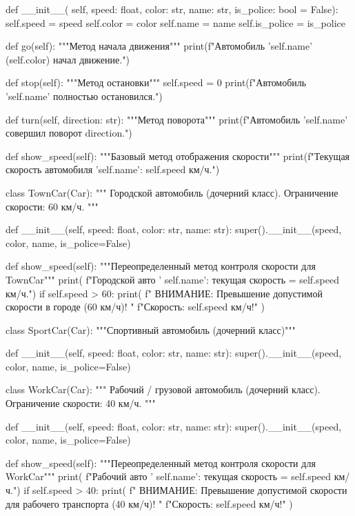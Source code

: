 \documentclass[14pt,a4paper]{extarticle}
\begin{document}
\begin{CodeListing}
    def __init__(
            self,
            speed: float,
            color: str,
            name: str,
            is_police: bool = False):
        self.speed = speed
        self.color = color
        self.name = name
        self.is_police = is_police

    def go(self):
        """Метод начала движения"""
        print(f"Автомобиль '{self.name}' ({self.color}) начал движение.")

    def stop(self):
        """Метод остановки"""
        self.speed = 0
        print(f"Автомобиль '{self.name}' полностью остановился.")

    def turn(self, direction: str):
        """Метод поворота"""
        print(f"Автомобиль '{self.name}' совершил поворот {direction}.")

    def show_speed(self):
        """Базовый метод отображения скорости"""
        print(f"Текущая скорость автомобиля '{self.name}': {self.speed} км/ч.")


class TownCar(Car):
    """
    Городской автомобиль (дочерний класс).
    Ограничение скорости: 60 км/ч.
    """

    def __init__(self, speed: float, color: str, name: str):
        super().__init__(speed, color, name, is_police=False)

    def show_speed(self):
        """Переопределенный метод контроля скорости для TownCar"""
        print(
            f"Городской авто '{
                self.name}': текущая скорость = {
                self.speed} км/ч.")
        if self.speed > 60:
            print(
                f"  ВНИМАНИЕ: Превышение допустимой скорости в городе (60 км/ч)! "
                f"Скорость: {self.speed} км/ч!"
            )


class SportCar(Car):
    """Спортивный автомобиль (дочерний класс)"""

    def __init__(self, speed: float, color: str, name: str):
        super().__init__(speed, color, name, is_police=False)


class WorkCar(Car):
    """
    Рабочий / грузовой автомобиль (дочерний класс).
    Ограничение скорости: 40 км/ч.
    """

    def __init__(self, speed: float, color: str, name: str):
        super().__init__(speed, color, name, is_police=False)

    def show_speed(self):
        """Переопределенный метод контроля скорости для WorkCar"""
        print(
            f"Рабочий авто '{
                self.name}': текущая скорость = {
                self.speed} км/ч.")
        if self.speed > 40:
            print(
                f"  ВНИМАНИЕ: Превышение допустимой скорости для рабочего транспорта (40 км/ч)! "
                f"Скорость: {self.speed} км/ч!"
            )



\end{CodeListing}
\end{document}
